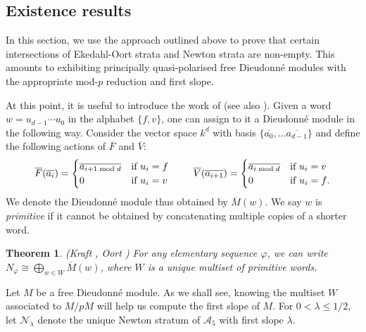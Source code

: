 \documentclass[11pt,table]{amsart}
\numberwithin{equation}{section}
\newtheorem{thm}{Theorem}
\theoremstyle{definition}
\theoremstyle{remark}
\theoremstyle{remark}
\begin{document}
\subsection{Existence results}

In this section, we use the approach outlined above to prove that certain intersections of Ekedahl-Oort strata and Newton strata are non-empty. This amounts to exhibiting principally quasi-polarised free Dieudonn\'{e} modules with the appropriate mod-$p$ reduction and first slope.

At this point, it is useful to introduce the work of \cite{KraftpGruppen} (see also \cite[(9.9)]{oort2001stratification}). Given a word $w=u_{d-1} \cdots u_0$ in the alphabet $\{f,v\}$, one can assign to it a Dieudonn\'{e} module in the following way. Consider the vector space $k^d$ with basis $\{\overline{a_0}, \ldots \overline{a_{d-1}}\}$ and define the following actions of $\overline{F}$ and $\overline{V}$:
\[\overline{F}(\overline{a_i})=\begin{cases} \overline{a_{i+1 \bmod d}} &\hbox{if $u_i=f$} \\ 0 &\hbox{if $u_i=v$} \end{cases} \hspace{8mm}
\overline{V}(\overline{a_{i+1}}) = \begin{cases} \overline{a_{i \bmod d}} &\hbox{if $u_i=v$} \\ 0 &\hbox{if $u_i=f$.}
\end{cases}\]
We denote the Dieudonn\'{e} module thus obtained by $\overline{M}(w)$. We say $w$ is \emph{primitive} if it cannot be obtained by concatenating multiple copies of a shorter word.

\begin{thm}{({\rm Kraft} \cite{KraftpGruppen}, {\rm Oort }\cite[(9.9)]{oort2001stratification})} \label{thm: Kraft}
For any elementary sequence $\varphi$, we can write $N_\varphi \cong \bigoplus_{w\in W} \overline{M}(w)$, where $W$ is a unique multiset of primitive words. 
\end{thm}

Let $M$ be a free Dieudonn\'{e} module. As we shall see, knowing the multiset $W$ associated to $M/pM$ will help us compute the first slope of $M$. For $0<\lambda\leq 1/2$, let $\mathcal{N}_\lambda$ denote the unique Newton stratum of $\mathcal{A}_5$ with first slope $\lambda$.
\end{document}
